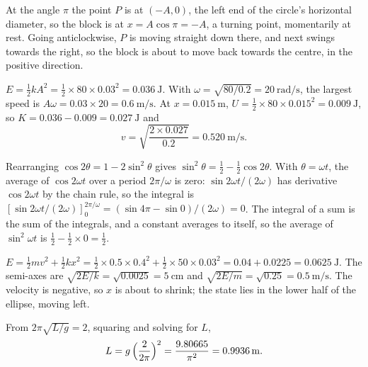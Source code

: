 \label{sec:os-solutions}

At the angle $\pi$ the point $P$ is at $(-A,
0)$, the left end of the circle's horizontal diameter, so the block is at
$x = A\cos\pi = -A$, a turning point, momentarily at rest. Going
anticlockwise, $P$ is moving straight down there, and next swings towards
the right, so the block is about to move back towards the centre, in the
positive direction.

$E = \frac12 kA^2 = \frac12\times80\times0.03^2 =
\SI{0.036}{\joule}$. With $\omega = \sqrt{80/0.2} =
\SI{20}{\radian\per\second}$, the largest speed is $A\omega = 0.03\times20 =
\SI{0.6}{\metre\per\second}$. At $x = \SI{0.015}{\metre}$, $U =
\frac12\times80\times0.015^2 = \SI{0.009}{\joule}$, so $K = 0.036 - 0.009
= \SI{0.027}{\joule}$ and
\begin{equation*}
   v = \sqrt{\frac{2\times0.027}{0.2}} = \SI{0.520}{\metre\per\second} .
\end{equation*}

Rearranging $\cos2\theta = 1 - 2\sin^2\theta$
gives $\sin^2\theta = \frac12 - \frac12\cos2\theta$. With $\theta = \omega
t$, the average of $\cos 2\omega t$ over a period $2\pi/\omega$ is zero:
$\sin 2\omega t/(2\omega)$ has derivative $\cos 2\omega t$ by the chain
rule, so the integral is $[\sin 2\omega t/(2\omega)]_0^{2\pi/\omega} =
(\sin4\pi - \sin 0)/(2\omega) = 0$. The integral of a sum is the sum of
the integrals, and a constant averages to itself, so the average of
$\sin^2\omega t$ is $\frac12 - \frac12\times0 = \frac12$.

$E = \frac12 mv^2 + \frac12 kx^2 =
\frac12\times0.5\times0.4^2 + \frac12\times50\times0.03^2 = 0.04 + 0.0225 =
\SI{0.0625}{\joule}$. The semi-axes are $\sqrt{2E/k} = \sqrt{0.0025} =
\SI{5}{\centi\metre}$ and $\sqrt{2E/m} = \sqrt{0.25} =
\SI{0.5}{\metre\per\second}$. The velocity is negative, so $x$ is about to
shrink; the state lies in the lower half of the ellipse, moving left.

From $2\pi\sqrt{L/g} = 2$, squaring and solving
for $L$,
\begin{equation*}
   L = g\,\Bigl(\frac{2}{2\pi}\Bigr)^2 = \frac{9.80665}{\pi^2}
   = \SI{0.9936}{\metre} .
\end{equation*}

